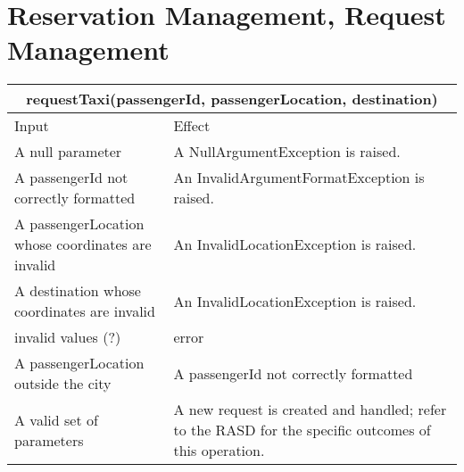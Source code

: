 \documentclass[11pt,oneside,a4paper]{report}
\begin{document}
\section{Reservation Management, Request Management}
\begin{tabular}{p{5cm}|p{6cm}}
\hline
	\multicolumn{2}{c}{requestTaxi(passengerId, passengerLocation, destination)}\\\hline
	Input & Effect \\\hline
	A null parameter &
	A NullArgumentException is raised.\\\hline
	A passengerId not correctly formatted &
	An InvalidArgumentFormatException is raised. \\\hline
	A passengerLocation whose coordinates are invalid &
	An InvalidLocationException is raised. \\\hline
	A destination whose coordinates are invalid &
	An InvalidLocationException is raised. \\\hline
	invalid values (?) &
	error \\\hline
	A passengerLocation outside the city &
	A passengerId not correctly formatted \\\hline
	A valid set of parameters &
	A new request is created and handled; refer to the RASD for the specific outcomes of this operation. \\\hline\hline
\end{tabular}
\end{document}
